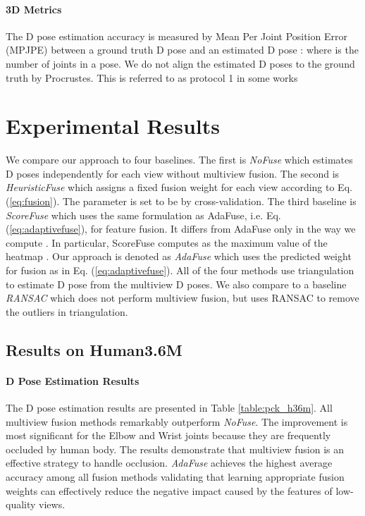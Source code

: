 \paragraph{3D Metrics}  The D pose estimation accuracy is measured by Mean Per Joint Position Error (MPJPE) between a ground truth D pose  and an estimated D pose :  where  is the number of joints in a pose.
We do not align the estimated D poses to the ground truth by Procrustes. This is referred to as protocol 1 in some works \citep{martinez2017simple,tome2018rethinking}


\section{Experimental Results}
\label{sec:experiments}
We compare our approach to four baselines. The first is \emph{NoFuse} which estimates D poses independently for each view without multiview fusion. The second is \emph{HeuristicFuse} which assigns a fixed fusion weight for each view according to Eq. (\ref{eq:fusion}). The parameter  is set to be  by cross-validation. 
{The third baseline is \emph{ScoreFuse} which uses the same formulation as AdaFuse, i.e. Eq. (\ref{eq:adaptivefuse}), for feature fusion. It differs from AdaFuse only in the way we compute . In particular, ScoreFuse computes  as the maximum value of the heatmap .}
Our approach is denoted as \emph{AdaFuse} which uses the predicted weight for fusion as in Eq. (\ref{eq:adaptivefuse}). All of the four methods use triangulation \citep{hartley2003multiple} to estimate D pose from the multiview D poses.  We also compare to a baseline \emph{RANSAC} which does not perform multiview fusion, but uses RANSAC to remove the outliers in triangulation.



\subsection{Results on Human3.6M}
\paragraph{D Pose Estimation Results}
The D pose estimation results are presented in Table \ref{table:pck_h36m}. All multiview fusion methods remarkably outperform \emph{NoFuse}. The improvement is most significant for the Elbow and Wrist joints because they are frequently occluded by human body. The results demonstrate that multiview fusion is an effective strategy to handle occlusion. \emph{AdaFuse} achieves the highest {average} accuracy among all fusion methods validating that learning appropriate fusion weights can effectively reduce the negative impact caused by the features of low-quality views.


